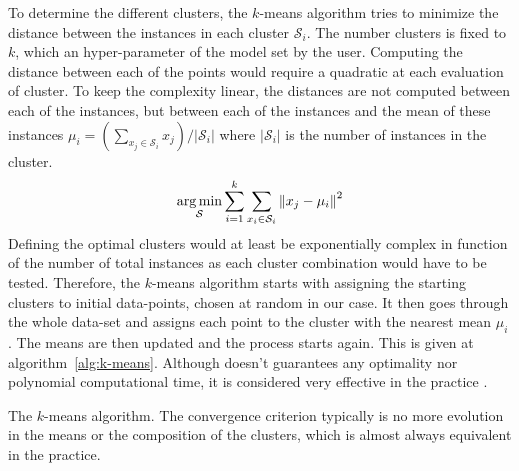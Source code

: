 To determine the different clusters, the $k$-means algorithm tries to minimize the distance between the instances in each cluster $\mathcal{S}_i$. The number clusters is fixed to $k$, which an hyper-parameter of the model set by the user. Computing the distance between each of the points would require a quadratic at each evaluation of cluster. To keep the complexity linear, the distances are not computed between each of the instances, but between each of the instances and the mean of these instances $\mu_i = \left( \sum_{x_j \in \mathcal{S}_i} x_j\right)/\vert \mathcal{S}_i \vert$ where $\vert \mathcal{S}_i \vert$ is the number of instances in the cluster.
\begin{equation}
    \underset{\mathcal{S}}{\mathrm{arg}\,\mathrm{min}} \sum_{i=1}^k \sum_{x_i \in \mathcal{S}_i} \left\lVert x_j-\mu_i\right\rVert^2
\end{equation}
Defining the optimal clusters would at least be exponentially complex in function of the number of total instances as each cluster combination would have to be tested. Therefore, the $k$-means algorithm starts with assigning the starting clusters to initial data-points, chosen at random in our case. It then goes through the whole data-set and assigns each point to the cluster with the nearest mean $\mu_i$. The means are then updated and the process starts again. This is given at algorithm~\ref{alg:k-means}. Although doesn't guarantees any optimality nor polynomial computational time, it is considered very effective in the practice \cite{Arthur2006Worst-caseMethod}.

\begin{center}
\begin{algorithm}[H]
\DontPrintSemicolon

\caption{The $k$-means algorithm. The convergence criterion typically is no more evolution in the means or the composition of the clusters, which is almost always equivalent in the practice.}
\label{alg:k-means}
\end{algorithm}
\end{center}

